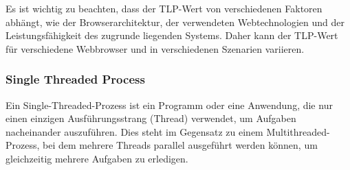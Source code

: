 \documentclass[../vs-script-first-v01.tex]{subfiles}
\begin{document}
Es ist wichtig zu beachten, dass der TLP-Wert von verschiedenen Faktoren abhängt, wie der Browserarchitektur, der verwendeten Webtechnologien und der Leistungsfähigkeit des zugrunde liegenden Systems. Daher kann der TLP-Wert für verschiedene Webbrowser und in verschiedenen Szenarien variieren.

\subsubsection{Single Threaded Process}
Ein Single-Threaded-Prozess ist ein Programm oder eine Anwendung, die nur einen einzigen Ausführungsstrang (Thread) verwendet, um Aufgaben nacheinander auszuführen. Dies steht im Gegensatz zu einem Multithreaded-Prozess, bei dem mehrere Threads parallel ausgeführt werden können, um gleichzeitig mehrere Aufgaben zu erledigen.
\end{document}
